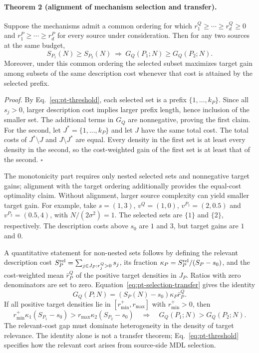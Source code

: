 \documentclass[10pt,a4paper]{article}
\theoremstyle{definition}
\begin{document}
\paragraph{Theorem 2 (alignment of mechanism selection and transfer).}
Suppose the mechanisms admit a common ordering for which
$r_1^Q\geq\cdots\geq r_d^Q\geq0$ and
$r_1^P\geq\cdots\geq r_d^P$ for every source under consideration.
Then for any two sources at the same budget,
\begin{equation}
 S_{P_1}(N)\geq S_{P_2}(N)
 \ \Longrightarrow\
 G_Q(P_1;N)\geq G_Q(P_2;N).
 \label{eq:pt-alignment}
\end{equation}
Moreover, under this common ordering the selected subset maximizes
target gain among subsets of the same description cost whenever
that cost is attained by the selected prefix.

\emph{Proof.}
By Eq.~\eqref{eq:pt-threshold}, each selected set is a prefix
$\{1,\ldots,k_P\}$. Since all $s_j>0$, larger description cost
implies larger prefix length, hence inclusion of the smaller set.
The additional terms in $G_Q$ are nonnegative, proving the first
claim. For the second, let $J^*=\{1,\ldots,k_P\}$ and let $J$
have the same total cost. The total costs of $J^*\setminus J$
and $J\setminus J^*$ are equal. Every density in the first set
is at least every density in the second, so the cost-weighted gain
of the first set is at least that of the second. \hfill$\square$

The monotonicity part requires only nested selected sets and
nonnegative target gains; alignment with the target ordering
additionally provides the equal-cost optimality claim. Without
alignment, larger source complexity can yield smaller target gain.
For example, take $s=(1,3)$, $v^Q=(1,0)$,
$v^{P_1}=(2,0.5)$ and $v^{P_2}=(0.5,4)$, with
$N/(2\sigma^2)=1$. The selected sets are $\{1\}$ and $\{2\}$,
respectively. The description costs above $s_0$ are $1$ and $3$,
but target gains are $1$ and $0$.

A quantitative statement for non-nested sets follows by defining
the relevant description cost
$S_P^{\rm rel}=\sum_{j\in J_P:r_j^Q>0}s_j$,
its fraction $\kappa_P=S_P^{\rm rel}/(S_P-s_0)$, and the
cost-weighted mean $\bar r_P^Q$ of the positive target densities
in $J_P$. Ratios with zero denominators are set to zero.
Equation~\eqref{eq:pt-selection-transfer} gives the identity
\begin{equation}
 G_Q(P;N)=(S_P(N)-s_0)\kappa_P\bar r_P^Q.
 \label{eq:pt-density}
\end{equation}
If all positive target densities lie in $[r_{\min}^+,r_{\max}]$
with $r_{\min}^+>0$, then
\[
 r_{\min}^+\kappa_1(S_{P_1}-s_0)>
 r_{\max}\kappa_2(S_{P_2}-s_0)
 \quad\Longrightarrow\quad G_Q(P_1;N)>G_Q(P_2;N).
\]
The relevant-cost gap must dominate heterogeneity in the density
of target relevance. The identity alone is not a transfer theorem;
Eq.~\eqref{eq:pt-threshold} specifies how the relevant cost arises
from source-side MDL selection.
\end{document}
